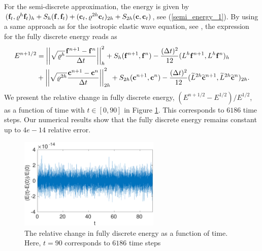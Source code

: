 For the semi-discrete approximation, the energy is given by $({\bf f}_t,\mathcal{\varrho}^h{\bf f}_t)_h + S_h({\bf f},{\bf f}_t) + ({\bf c}_t,\mathcal{\varrho}^{2h}{\bf c}_t)_{2h} + S_{2h}({\bf c},{\bf c}_t)$, see (\ref{semi_energy_1}). By using a same approach as for the isotropic elastic wave equation, see \cite{petersson2015wave,sjogreen2012fourth},  the expression for the fully discrete energy reads as
\begin{align*}
E^{n+1/2} &= \left|\left|\sqrt{\mathcal{\varrho}^h}\frac{{\bf f}^{n+1}-{\bf f}^n}{\Delta t}\right|\right|_h^2 + S_h({\bf f}^{n+1},{\bf f}^n) - \frac{(\Delta t)^2}{12}(L^h{\bf f}^{n+1},L^h{\bf f}^n)_h\\
&+ \left|\left|\sqrt{\mathcal{\varrho}^{2h}}\frac{{\bf c}^{n+1}-{\bf c}^n}{\Delta t}\right|\right|_{2h}^2 + S_{2h}({\bf c}^{n+1},{\bf c}^n) - \frac{(\Delta t)^2}{12}(\widetilde{L}^{2h}\widetilde{\bf c}^{n+1},\widetilde{L}^{2h}\widetilde{\bf c}^n)_{2h}.
\end{align*}
We present the relative change in fully discrete energy, $(E^{n+1/2}-E^{1/2})/E^{1/2}$, as a function of time with $t\in[0,90]$ in Figure \ref{discrete_energy}. This corresponds to $6186$ time steps. Our numerical results show that the fully discrete energy remains constant up to $4e-14$ relative error. 
\begin{figure}[htbp]
	\centering
	\includegraphics[width=0.6\textwidth,trim={0cm 0cm 0cm 0cm}, clip]{discrete_energy.eps}
	\caption{The relative change in fully discrete energy as a function of time. Here, $t = 90$ corresponds to $6186$ time steps}\label{discrete_energy}
\end{figure}


